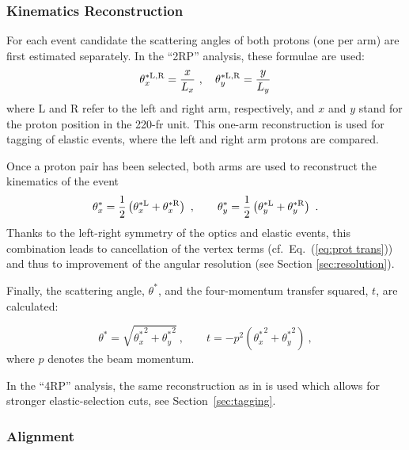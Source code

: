 \subsubsection{Kinematics Reconstruction}
\label{sec:kinematics}

For each event candidate the scattering angles of both protons (one per arm) are first estimated separately. In the ``2RP'' analysis, these formulae are used:
\begin{equation}
\label{eq:kin 1a}
	\theta^{*\rm L,R}_x = {x\over L_x}\ ,\quad \theta^{*\rm L,R}_y = {y\over L_y}
\end{equation}
where L and R refer to the left and right arm, respectively, and $x$ and $y$ stand for the proton position in the 220-fr unit. This one-arm reconstruction is used for tagging of elastic events, where the left and right arm protons are compared.

Once a proton pair has been selected, both arms are used to reconstruct the kinematics of the event
\begin{equation}
\label{eq:kin 2a}
		\theta_x^* = {1\over 2} \left( \theta^{*\rm L}_x + \theta^{*\rm R}_x \right)\ ,\qquad
		\theta_y^* = {1\over 2} \left( \theta^{*\rm L}_y + \theta^{*\rm R}_y \right)\ .
\end{equation}
Thanks to the left-right symmetry of the optics and elastic events, this combination leads to cancellation of the vertex terms (cf.~Eq.~(\ref{eq:prot trans})) and thus to improvement of the angular resolution (see Section \ref{sec:resolution}).

Finally, the scattering angle, $\theta^*$, and the four-momentum transfer squared, $t$, are calculated:

\begin{equation}
\label{eq:th t}
\theta^* = \sqrt{{\theta_x^*}^2 + {\theta_y^*}^2}\ ,\qquad t = - p^2 ({\theta_x^*}^2 + {\theta_y^*}^2)\ ,
\end{equation}
where $p$ denotes the beam momentum.

In the ``4RP'' analysis, the same reconstruction as in \cite{totem-8tev-1km} is used which allows for stronger elastic-selection cuts, see Section~\ref{sec:tagging}.




\subsubsection{Alignment}
\label{sec:alignment}

